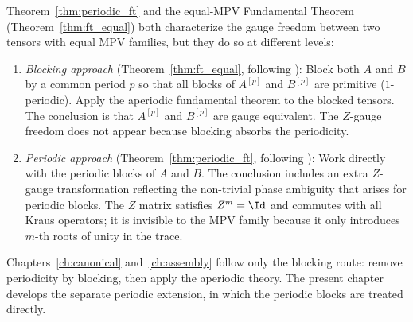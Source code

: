 \begin{remark}\notready
    \label{rem:periodic_vs_blocking_ft}
    Theorem~\ref{thm:periodic_ft} and the equal-MPV Fundamental Theorem
    (Theorem~\ref{thm:ft_equal}) both characterize the gauge freedom
    between two tensors with equal MPV families, but they do so at
    different levels:

    \begin{enumerate}
        \item \emph{Blocking approach} (Theorem~\ref{thm:ft_equal},
              following \cite{Cirac2017MPDO_AnnPhys}):
              Block both $A$ and $B$ by a common period $p$ so that all
              blocks of $A^{[p]}$ and $B^{[p]}$ are primitive
              ($1$-periodic). Apply the aperiodic fundamental theorem to
              the blocked tensors. The conclusion is that $A^{[p]}$ and
              $B^{[p]}$ are gauge equivalent. The $Z$-gauge freedom
              does not appear because blocking absorbs the periodicity.

        \item \emph{Periodic approach} (Theorem~\ref{thm:periodic_ft},
              following \cite{DeLasCuevas2017Irreducible}):
              Work directly with the periodic blocks of $A$ and $B$.
              The conclusion includes an extra $Z$-gauge transformation
              reflecting the non-trivial phase ambiguity that arises for
              periodic blocks. The $Z$ matrix satisfies $Z^m = \Id$ and
              commutes with all Kraus operators; it is invisible to the
              MPV family because it only introduces $m$-th roots of unity
              in the trace.
    \end{enumerate}

    Chapters~\ref{ch:canonical} and~\ref{ch:assembly} follow only the
    blocking route: remove periodicity by blocking, then apply the
    aperiodic theory. The present chapter develops the separate periodic
    extension, in which the periodic blocks are treated directly.
\end{remark}

